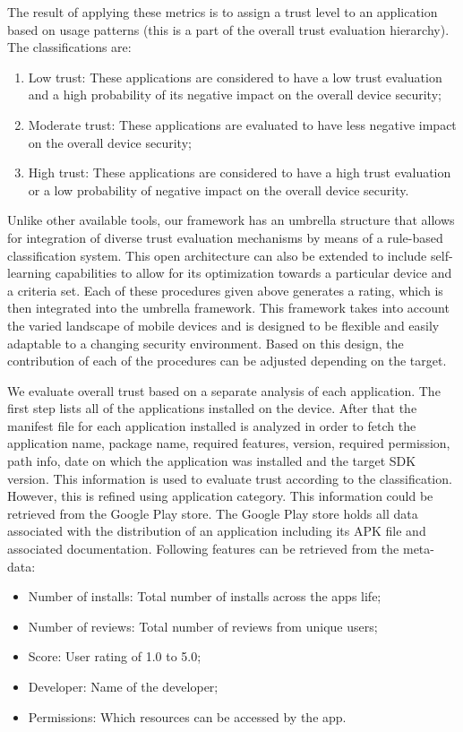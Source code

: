 The result of applying these metrics is to assign a trust level to an application based on usage patterns (this is a part of the
overall trust evaluation hierarchy).
The classifications are: 
\begin{enumerate}
  \item Low trust: These applications are considered to have
a low trust evaluation and a high probability of its negative
impact on the overall device security;
  \item Moderate trust: These applications are evaluated to have
less negative  impact on the overall device security;
  \item High trust: These applications are considered to have a high
trust evaluation or a low probability of  negative impact
on the overall device security.
\end{enumerate}


Unlike other available tools, our framework has an umbrella structure that allows for integration of 
diverse trust evaluation mechanisms by means of a rule-based classification system.
This open architecture can also be extended to include 
 self-learning capabilities to allow for its optimization towards a particular device and a criteria set. Each of these procedures given above generates a rating, which is then integrated into the umbrella framework. This framework takes into account the varied landscape of mobile devices and is designed to be flexible and easily adaptable to a changing security environment. 
Based on this design, the contribution of each of the procedures can be adjusted depending on the target.


We evaluate overall trust based on a separate
analysis of each application. The first step lists all of the
applications installed on the device. After that the
manifest file for each application installed is analyzed in order to
fetch the application name, package name, required features,
version, required permission, path info, date on which the
application was installed and the target SDK version. This
information is used to evaluate  trust according to the classification.
However, this is refined using
application category. This information could
be retrieved from the Google Play store. The Google Play store
holds all data associated with the distribution of an application
including its APK file and associated documentation.  Following
features can be retrieved from the
meta-data:
\begin{itemize}
  \item Number of installs: Total number of installs across the apps life;
  \item Number of reviews: Total number of reviews from unique users;
  \item Score: User rating of 1.0 to 5.0;
  \item Developer: Name of the developer; 
  \item Permissions: Which resources can be accessed by the app.
\end{itemize}

